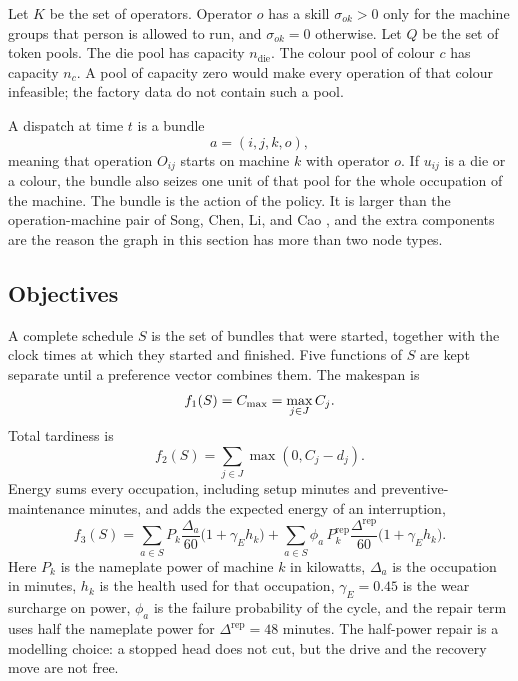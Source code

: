 Let \(K\) be the set of operators. Operator \(o\) has a skill \(\sigma_{ok} > 0\) only for the machine groups that person is allowed to run, and \(\sigma_{ok} = 0\) otherwise. Let \(Q\) be the set of token pools. The die pool has capacity \(n_{\mathrm{die}}\). The colour pool of colour \(c\) has capacity \(n_c\). A pool of capacity zero would make every operation of that colour infeasible; the factory data do not contain such a pool.

A dispatch at time \(t\) is a bundle
\begin{equation}
a = (i,j,k,o) ,
\label{eq:bundle}
\end{equation}
meaning that operation \(O_{ij}\) starts on machine \(k\) with operator \(o\). If \(u_{ij}\) is a die or a colour, the bundle also seizes one unit of that pool for the whole occupation of the machine. The bundle is the action of the policy. It is larger than the operation-machine pair of Song, Chen, Li, and Cao \cite{song2023}, and the extra components are the reason the graph in this section has more than two node types.

\subsection{Objectives}

A complete schedule \(S\) is the set of bundles that were started, together with the clock times at which they started and finished. Five functions of \(S\) are kept separate until a preference vector combines them. The makespan is
\begin{equation}
f_1(S) = C_{\max} = \max_{j \in J} C_j .
\label{eq:f1}
\end{equation}
Total tardiness is
\begin{equation}
f_2(S) = \sum_{j \in J} \max(0, C_j - d_j) .
\label{eq:f2}
\end{equation}
Energy sums every occupation, including setup minutes and preventive-maintenance minutes, and adds the expected energy of an interruption,
\begin{equation}
f_3(S) = \sum_{a \in S} P_k \frac{\Delta_a}{60}\big(1 + \gamma_E h_k\big) + \sum_{a \in S} \phi_a \, P_k^{\mathrm{rep}} \frac{\Delta^{\mathrm{rep}}}{60}\big(1 + \gamma_E h_k\big) .
\label{eq:f3}
\end{equation}
Here \(P_k\) is the nameplate power of machine \(k\) in kilowatts, \(\Delta_a\) is the occupation in minutes, \(h_k\) is the health used for that occupation, \(\gamma_E = 0.45\) is the wear surcharge on power, \(\phi_a\) is the failure probability of the cycle, and the repair term uses half the nameplate power for \(\Delta^{\mathrm{rep}} = 48\) minutes. The half-power repair is a modelling choice: a stopped head does not cut, but the drive and the recovery move are not free.

